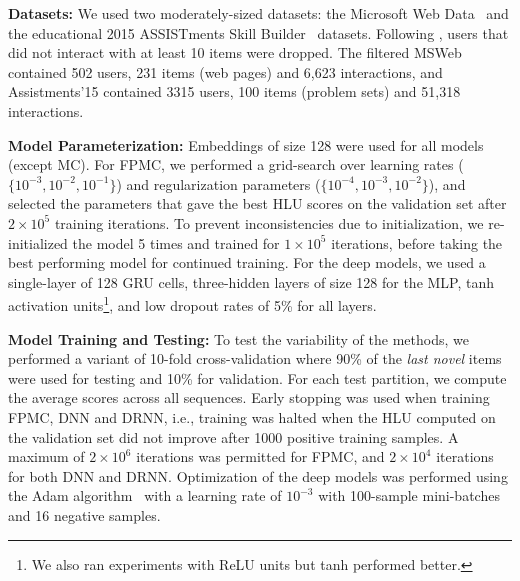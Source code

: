\documentclass{sig-alternate-05-2015}
\begin{document}
\vspace{2mm}
\noindent\textbf{Datasets:} We used two moderately-sized datasets: the Microsoft Web Data~\cite{Breese1998} and the educational 2015 ASSISTments Skill Builder~\cite{Assistmentsdata} datasets. Following \cite{Rendle2010}, users that did not interact with at least 10 items were dropped. The filtered MSWeb contained 502 users, 231 items (web pages) and 6,623 interactions, and  Assistments'15 contained 3315 users, 100 items (problem sets) and 51,318 interactions. 

\vspace{2mm}
\noindent\textbf{Model Parameterization:} Embeddings of size 128 were used for all models (except MC). For FPMC, we performed a grid-search over learning rates ($\{10^{-3},10^{-2},10^{-1}\}$) and regularization parameters ($\{10^{-4},10^{-3},10^{-2}\}$), and selected the parameters that gave the best HLU scores on the validation set after $2\times10^5$ training iterations. To prevent inconsistencies due to initialization, we re-initialized the model 5 times and trained for $1\times10^5$ iterations, before taking the best performing model for continued training. For the deep models, we used a single-layer of 128 GRU cells, three-hidden layers of size 128 for the MLP, tanh activation units\footnote{We also ran experiments with ReLU units but tanh performed better.}, and low dropout rates of 5\% for all layers. 

\vspace{2mm}
\noindent\textbf{Model Training and Testing:} To test the variability of the methods, we performed a variant of 10-fold cross-validation where 90\% of the \emph{last novel} items were used for testing and 10\% for validation. For each test partition, we compute the average scores across all sequences. Early stopping was used when training FPMC, DNN and DRNN, i.e., training was halted when the HLU computed on the validation set did not improve after 1000 positive training samples. A maximum of $2\times 10^6$ iterations was permitted for FPMC, and $2\times 10^4$ iterations for both DNN and DRNN. Optimization of the deep models was performed using the Adam algorithm~\cite{Kingma2015} with a learning rate of $10^{-3}$ with 100-sample mini-batches and 16 negative samples.
\end{document}
